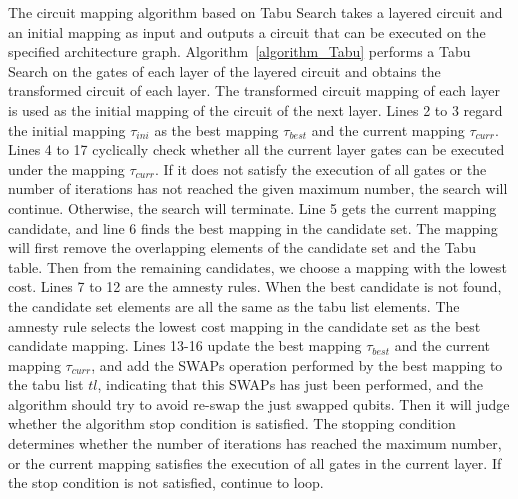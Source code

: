 \documentclass[runningheads]{llncs}
\begin{document}
	The circuit mapping algorithm based on Tabu Search takes a layered circuit and an initial mapping as input and outputs a circuit that can be executed on the specified architecture graph. Algorithm~\ref{algorithm_Tabu} performs a Tabu Search on the gates of each layer of the layered circuit and obtains the transformed circuit of each layer. The transformed circuit mapping of each layer is used as the initial mapping of the circuit of the next layer. Lines 2 to 3 regard the initial mapping $\tau_{ini}$ as the best mapping $\tau_{best}$ and the current mapping $\tau_{curr}$. Lines 4 to 17 cyclically check whether all the current layer gates can be executed under the mapping $\tau_{curr}$. If it does not satisfy the execution of all gates or the number of iterations has not reached the given maximum number, the search will continue. Otherwise, the search will terminate. Line 5  gets the current mapping candidate, and line 6 finds the best mapping in the candidate set. The mapping will first remove the overlapping elements of the candidate set and the Tabu table. Then from the remaining candidates, we choose a mapping with the lowest cost. Lines 7 to 12 are the amnesty rules. When the best candidate is not found, the candidate set elements are all the same as the tabu list elements. The amnesty rule selects the lowest cost mapping in the candidate set as the best candidate mapping. Lines 13-16 update the best mapping $\tau_{best}$ and the current mapping $\tau_{curr}$, and add the SWAPs operation performed by the best mapping to the tabu list $tl$, indicating that this SWAPs has just been performed, and the algorithm should try to avoid re-swap the just swapped qubits. Then it will judge whether the algorithm stop condition is satisfied. The stopping condition determines whether the number of iterations has reached the maximum number, or the current mapping satisfies the execution of all gates in the current layer. If the stop condition is not satisfied, continue to loop.
\end{document}
